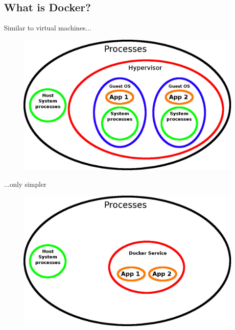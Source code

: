 \documentclass{beamer}
\begin{document}
    \subsection{What is Docker?}
    \begin{frame}{Similar to virtual machines...}
        \begin{figure}[htpb]
            \centering
            \includegraphics[width=0.8\linewidth]{VM.jpg}
        \end{figure}
    \end{frame}
    \begin{frame}{...only simpler}
        \begin{figure}[htpb]
            \centering
            \includegraphics[width=0.8\linewidth]{Docker.jpg}
        \end{figure}
    \end{frame}
\end{document}
